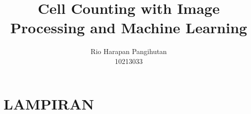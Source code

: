 \documentclass[12pt,a4paper, onecolumn, oneside, final]{report}
\begin{document}
	\title{Cell Counting with Image Processing and Machine Learning}
	\date{}
	\author{
		Rio Harapan Pangihutan\\
		10213033
	}
	
	
	

	\setcounter{page}{1}

	
	
	
	
	
	
	\newpage


	\setcounter{page}{10}
	
	
	
	
	

\printbibliography
\chapter*{\centering LAMPIRAN}
\end{document}
